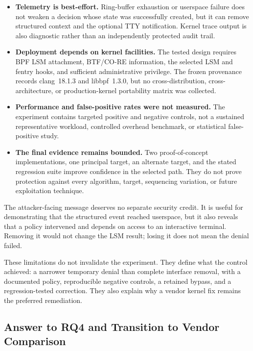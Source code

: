 \begin{itemize}
    \item
    \textbf{Telemetry is best-effort.} Ring-buffer exhaustion or userspace
    failure does not weaken a decision whose state was successfully created, but
    it can remove structured context and the optional TTY notification. Kernel
    trace output is also diagnostic rather than an independently protected audit
    trail.

    \item
    \textbf{Deployment depends on kernel facilities.} The tested design requires
    BPF LSM attachment, BTF/CO-RE information, the selected LSM and fentry hooks,
    and sufficient administrative privilege. The frozen provenance records
    clang~18.1.3 and libbpf~1.3.0, but no cross-distribution, cross-architecture,
    or production-kernel portability matrix was collected.

    \item
    \textbf{Performance and false-positive rates were not measured.} The
    experiment contains targeted positive and negative controls, not a sustained
    representative workload, controlled overhead benchmark, or statistical
    false-positive study.

    \item
    \textbf{The final evidence remains bounded.} Two proof-of-concept
    implementations, one principal target, an alternate target, and the stated
    regression suite improve confidence in the selected path. They do not prove
    protection against every algorithm, target, sequencing variation, or future
    exploitation technique.
\end{itemize}

The attacker-facing message deserves no separate security credit. It is useful
for demonstrating that the structured event reached userspace, but it also
reveals that a policy intervened and depends on access to an interactive
terminal. Removing it would not change the LSM result; losing it does not mean
the denial failed.

These limitations do not invalidate the experiment. They define what the
control achieved: a narrower temporary denial than complete interface removal,
with a documented policy, reproducible negative controls, a retained bypass,
and a regression-tested correction. They also explain why a vendor kernel fix
remains the preferred remediation.

\subsection{Answer to RQ4 and Transition to Vendor Comparison}


